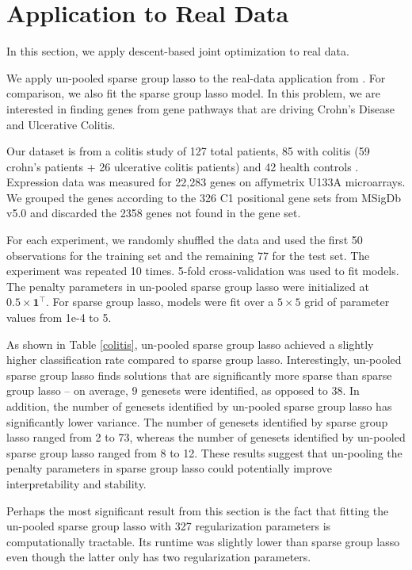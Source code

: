 \documentclass[10pt,letterpaper]{article}
\begin{document}
\section{Application to Real Data}
In this section, we apply descent-based joint optimization to real data.

We apply un-pooled sparse group lasso to the real-data application from \citet{simon2013sparse}. For comparison, we also fit the sparse group lasso model. In this problem, we are interested in finding genes from gene pathways that are driving Crohn's Disease and Ulcerative Colitis.

Our dataset is from a colitis study of 127 total patients, 85 with colitis (59 crohn's patients + 26 ulcerative colitis patients) and 42 health controls \citep{burczynski2006molecular}. Expression data was measured for 22,283 genes on affymetrix U133A microarrays. We grouped the genes according to the 326 C1 positional gene sets from MSigDb v5.0 \citep{subramanian2005gene} and discarded the 2358 genes not found in the gene set.

For each experiment, we randomly shuffled the data and used the first 50 observations for the training set and the remaining 77 for the test set. The experiment was repeated 10 times. 5-fold cross-validation was used to fit models. The penalty parameters in un-pooled sparse group lasso were initialized at $0.5 \times \boldsymbol 1^\top$. For sparse group lasso, models were fit over a $5 \times 5$ grid of parameter values from 1e-4 to 5.

As shown in Table \ref{colitis}, un-pooled sparse group lasso achieved a slightly higher classification rate compared to sparse group lasso. Interestingly, un-pooled sparse group lasso finds solutions that are significantly more sparse than sparse group lasso -- on average, 9 genesets were identified, as opposed to 38. In addition, the number of genesets identified by un-pooled sparse group lasso has significantly lower variance. The number of genesets identified by sparse group lasso ranged from 2 to 73, whereas the number of genesets identified by un-pooled sparse group lasso ranged from 8 to 12. These results suggest that un-pooling the penalty parameters in sparse group lasso could potentially improve interpretability and stability.

Perhaps the most significant result from this section is the fact that fitting the un-pooled sparse group lasso with 327 regularization parameters is computationally tractable. Its runtime was slightly lower than sparse group lasso even though the latter only has two regularization parameters.
\end{document}
